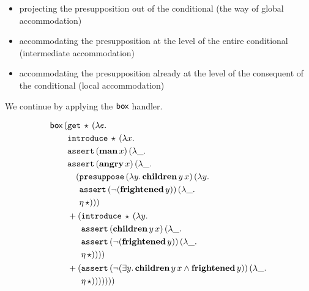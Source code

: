 \begin{itemize}
\item projecting the presupposition out of the conditional (the way of
  global accommodation)
\item accommodating the presupposition at the level of the entire
  conditional (intermediate accommodation)
\item accommodating the presupposition already at the level of the
  consequent of the conditional (local accommodation)
\end{itemize}

We continue by applying the $\textsf{box}$ handler.

\begin{align*}
   &\ap{\BOX}{(\begin{aligned}[t]
      &\app{\op{get}}{\star}{(\lam{e}{ \\
      &\app{\op{introduce}}{\star}{(\lam{x}{ \\
      &\app{\op{assert}}{(\ap{\obj{man}}{x})}{(\lam{\_}{ \\
      &\app{\op{assert}}{(\ap{\obj{angry}}{x})}{(\lam{\_}{ \\
      &\quad \begin{aligned}[t]
          (&\app{\op{presuppose}}{(\lam{y}{\app{\obj{children}}{y}{x}})}{(\lam{y}{ \\
           &\app{\op{assert}}{(\lnot (\ap{\obj{frightened}}{y}))}{(\lam{\_}{ \\
           &\etaE{\star}})}})})
         \end{aligned} \\
      &+ \begin{aligned}[t]
          (&\app{\op{introduce}}{\star}{(\lam{y}{ \\
           &\app{\op{assert}}{(\app{\obj{children}}{y}{x})}{(\lam{\_}{ \\
           &\app{\op{assert}}{(\lnot (\ap{\obj{frightened}}{y}))}{(\lam{\_}{ \\
           &\etaE{\star}})}})}})})
         \end{aligned} \\
      &+ \begin{aligned}[t]
          (&\app{\op{assert}}{(\lnot (\exists y.\, \app{\obj{children}}{y}{x} \land \ap{\obj{frightened}}{y}))}{(\lam{\_}{ \\
           &\etaE{\star}})}))))))
         \end{aligned}}}}}}}}}
    \end{aligned}} \\

\end{align*}
